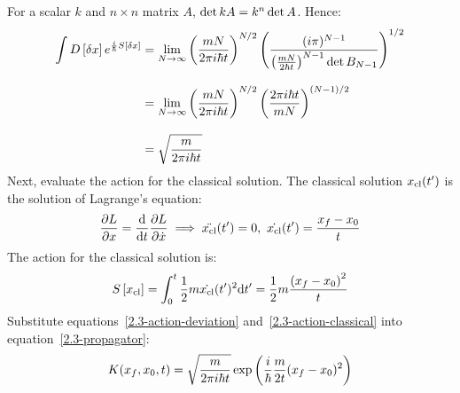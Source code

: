 For a scalar $k$ and $n\times n$ matrix $A$, $\det k\matr{A} = k^n
  \det\matr{A}$.
Hence:
\begin{align}
  \int \func{D}{\xd} e^{\frac{i}{\hbar} \func{S}{\xd}}
   & =
  \lim_{N \to \infty}
  \left(\frac{mN}{2\pi i\hbar t}\right)^{N/2}
  \left(\frac{(i\pi)^{N-1}}{\left(\frac{mN}{2\hbar t}\right)^{N-1}\det\matr{B}_{N-1}}\right)^{1/2}
  \nonumber
  \\[2ex]
   & =
  \lim_{N \to \infty}
  \left(\frac{mN}{2\pi i\hbar t}\right)^{N/2}
  \left(\frac{2\pi i\hbar t}{mN}\right)^{(N-1)/2}
  \nonumber
  \\[2ex]
  \label{2.3-action-deviation}
   & =
  \sqrt{\frac{m}{2\pi i\hbar t}}
\end{align}
Next, evaluate the action for the classical solution.
The classical solution $\xcl(\tp)$ is the solution of Lagrange's equation:
\begin{equation*}
  \del[L]{x} = \ddt\del[L]{\dot{x}}
  \implies
  \ddot{\xcl}(\tp) = 0,\
  \dot{\xcl}(\tp) = \frac{x_f - x_0}{t}
\end{equation*}
The action for the classical solution is:
\begin{equation}
  \label{2.3-action-classical}
  \func{S}{\xcl} = \int_{0}^{t} \half m \dot{\xcl}(\tp)^2 \dtp
  = \half m \frac{\left(x_f - x_0\right)^2}{t}
\end{equation}
Substitute equations~\ref{2.3-action-deviation} and~\ref{2.3-action-classical}
into equation~\ref{2.3-propagator}:
\begin{equation}
  \label{2.3-result}
  \propagator = \sqrt{\frac{m}{2\pi i\hbar t}}\exp\left(\ihbar\frac{m}{2t}(x_f - x_0)^2\right)
\end{equation}
